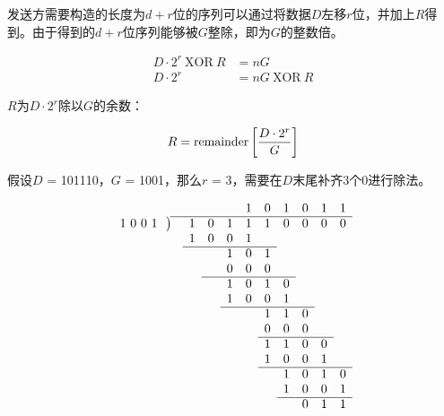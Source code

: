 \vspace{0.5cm}

发送方需要构造的长度为$ d + r $位的序列可以通过将数据$ D $左移$ r $位，并加上$ R $得到。由于得到的$ d + r $位序列能够被$ G $整除，即为$ G $的整数倍。

\vspace{-1cm}

\begin{align*}
    D \cdot 2^r\ \text{XOR}\ R & = nG                \\
    D \cdot 2^r                & = nG\ \text{XOR}\ R
\end{align*}

$ R $为$ D \cdot 2^r $除以$ G $的余数：

\vspace{-1cm}

\begin{align*}
    R = \text{remainder}\left[{D \cdot 2^r} \over G\right]
\end{align*}

假设$ D $ = 101110，$ G $ = 1001，那么$ r $ = 3，需要在$ D $末尾补齐3个0进行除法。

\vspace{-1cm}

\begin{align*}
    \begin{array}{m{3.5em}cccccccccc}
         &   &   &   &   & 1 & 0 & 1 & 0 & 1 & 1 \\
        \cline{2-11}
        \multicolumn{2}{l}{1\ 0\ 0\ 1\ \ \big)}
         & 1 & 0 & 1 & 1 & 1 & 0 & 0 & 0 & 0     \\
         &   & 1 & 0 & 0 & 1 &   &   &   &       \\
        \cline{3-7}
         &   &   &   & 1 & 0 & 1 &   &   &       \\
         &   &   &   & 0 & 0 & 0 &   &   &       \\
        \cline{4-8}
         &   &   &   & 1 & 0 & 1 & 0 &   &       \\
         &   &   &   & 1 & 0 & 0 & 1 &   &       \\
        \cline{5-9}
         &   &   &   &   &   & 1 & 1 & 0 &       \\
         &   &   &   &   &   & 0 & 0 & 0 &       \\
        \cline{7-10}
         &   &   &   &   &   & 1 & 1 & 0 & 0     \\
         &   &   &   &   &   & 1 & 0 & 0 & 1     \\
        \cline{7-11}
         &   &   &   &   &   &   & 1 & 0 & 1 & 0 \\
         &   &   &   &   &   &   & 1 & 0 & 0 & 1 \\
        \cline{8-11}
         &   &   &   &   &   &   &   & 0 & 1 & 1
    \end{array}
\end{align*}

